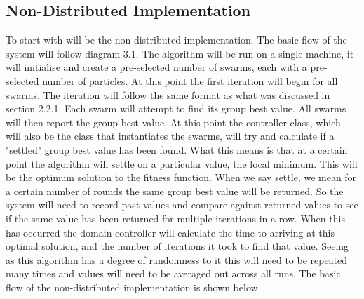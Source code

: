 \documentclass[oneside,12pt]{book}
\begin{document}
\subsection{Non-Distributed Implementation}
To start with will be the non-distributed implementation. The basic flow of the system will follow diagram 3.1. The algorithm will be run on a single machine, it will initialise and create a pre-selected number of swarms, each with a pre-selected number of particles. At this point the first iteration will begin for all swarms. The iteration will follow the same format as what was discussed in section 2.2.1. Each swarm will attempt to find its group best value. All swarms will then report the group best value. At this point the controller class, which will also be the class that instantiates the swarms, will try and calculate if a "settled" group best value has been found. What this means is that at a certain point the algorithm will settle on a particular value, the local minimum. This will be the optimum solution to the fitness function. When we say settle, we mean for a certain number of rounds the same group best value will be returned. So the system will need to record past values and compare against returned values to see if the same value has been returned for multiple iterations in a row. When this has occurred the domain controller will calculate the time to arriving at this optimal solution, and the number of iterations it took to find that value. Seeing as this algorithm has a degree of randomness to it this will need to be repeated many times and values will need to be averaged out across all runs. 
The basic flow of the non-distributed implementation is shown below. 
\end{document}
